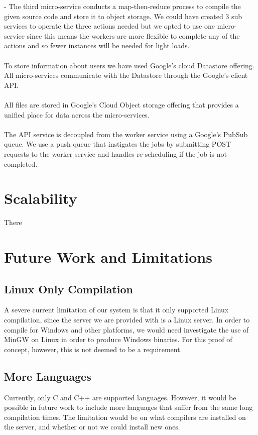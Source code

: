 \documentclass[conference]{IEEEtran}
\begin{document}
- The third micro-service conducts a map-then-reduce process to compile the given source code and store it to object storage. We could have created 3 sub services to operate the three actions needed but we opted to use one micro-service since this means the workers are more flexible to complete any of the actions and so fewer instances will be needed for light loads.
\\\\
To store information about users we have used Google's cloud Datastore offering. All micro-services communicate with the Datastore through the Google's client API.
\\\\
All files are stored in Google's Cloud Object storage offering that provides a unified place for data across the micro-services.
\\\\
The API service is decoupled from the worker service using a Google's PubSub queue. We use a push queue that instigates the jobs by submitting POST requests to the worker service and handles re-scheduling if the  job is not completed.

\section{Scalability}

There 

\section{Future Work and Limitations}
\subsection{Linux Only Compilation}
A severe current limitation of our system is that it only supported Linux
compilation, since the server we are provided with is a Linux server. In order
to compile for Windows and other platforms, we would need investigate the use of
MinGW on Linux in order to produce Windows binaries. For this proof of concept,
however, this is not deemed to be a requirement.
\subsection{More Languages}
Currently, only C and C++ are supported languages. However, it would be possible
in future work to include more languages that suffer from the same long
compilation times. The limitation would be on what compilers are installed on
the server, and whether or not we could install new ones.
\end{document}
